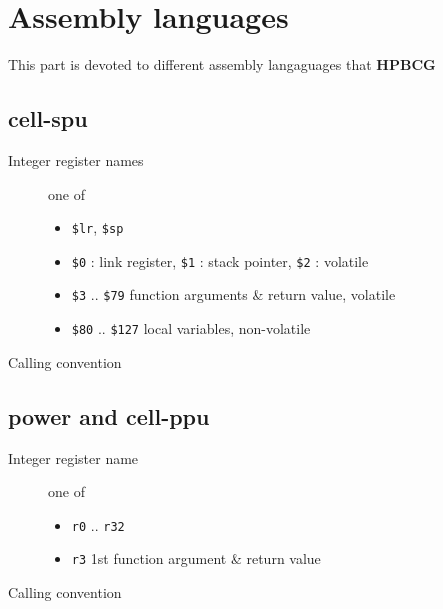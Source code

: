 \documentclass{article}
\newcommand{\hpbcg}{\textbf{HPBCG}\ }
\begin{document}
\section{Assembly languages}

This part is devoted to different assembly langaguages that \hpbcg

\subsection{cell-spu}

\begin{description}
\item[Integer register names] one of
  \begin{itemize}
  \item \verb|$lr|, \verb|$sp|
  \item \verb|$0| : link register, \verb|$1| : stack pointer,
    \verb|$2| : volatile
  \item \verb|$3| .. \verb|$79| function arguments \& return value, volatile
  \item \verb|$80| .. \verb|$127| local variables, non-volatile
  \end{itemize}
\item[Calling convention] 
\end{description}

\subsection{power and cell-ppu }

\begin{description}
\item[Integer register name]  one of
  \begin{itemize}
  \item \verb|r0| .. \verb|r32|
  \item \verb|r3| 1st function argument \& return value
  \end{itemize}
\item[Calling convention] 
\end{description}
\end{document}
